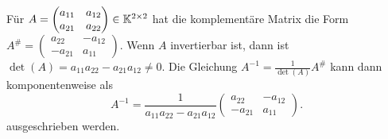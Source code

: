 \begin{bsp}[$ n=2 $]
	Für $ A = \begin{pmatrix}
		a_{11} & a_{12} \\
		a_{21} & a_{22}
	\end{pmatrix} \in \mathbb K^{2 \times 2} $
	hat die komplementäre Matrix die Form $ A^\# = \begin{pmatrix}
		a_{22} & -a_{12} \\
		-a_{21} & a_{11}
	\end{pmatrix} $.
	Wenn $A$ invertierbar ist, dann ist $ \det(A) = a_{11}a_{22} - a_{21}a_{12} \neq 0 $. Die Gleichung $A^{-1} = \frac{1}{\det(A)}A^\#$ kann dann komponentenweise als 
	\[
		A^{-1}  = \frac{1}{a_{11}a_{22} - a_{21}a_{12}} \begin{pmatrix}
		a_{22} & -a_{12} \\
		-a_{21} & a_{11}
		\end{pmatrix}.
	\]
	ausgeschrieben werden. 
\end{bsp}

